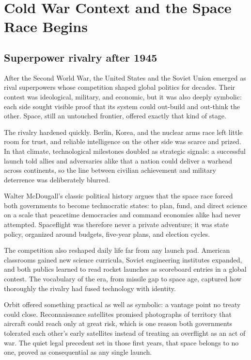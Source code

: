 \section{Cold War Context and the Space Race Begins}

\subsection{Superpower rivalry after 1945}
After the Second World War, the United States and the Soviet Union emerged as rival superpowers whose competition shaped global politics for decades. Their contest was ideological, military, and economic, but it was also deeply symbolic: each side sought visible proof that its system could out-build and out-think the other. Space, still an untouched frontier, offered exactly that kind of stage.

The rivalry hardened quickly. Berlin, Korea, and the nuclear arms race left little room for trust, and reliable intelligence on the other side was scarce and prized. In that climate, technological milestones doubled as strategic signals: a successful launch told allies and adversaries alike that a nation could deliver a warhead across continents, so the line between civilian achievement and military deterrence was deliberately blurred.

Walter McDougall's classic political history argues that the space race forced both governments to become technocratic states: to plan, fund, and direct science on a scale that peacetime democracies and command economies alike had never attempted. Spaceflight was therefore never a private adventure; it was state policy, organized around budgets, five-year plans, and election cycles.

The competition also reshaped daily life far from any launch pad. American classrooms gained new science curricula, Soviet engineering institutes expanded, and both publics learned to read rocket launches as scoreboard entries in a global contest. The vocabulary of the era, from missile gap to space age, captured how thoroughly the rivalry had fused technology with identity.

Orbit offered something practical as well as symbolic: a vantage point no treaty could close. Reconnaissance satellites promised photographs of territory that aircraft could reach only at great risk, which is one reason both governments tolerated each other's early satellites instead of treating an overflight as an act of war. The quiet legal precedent set in those first years, that space belongs to no one, proved as consequential as any single launch.

